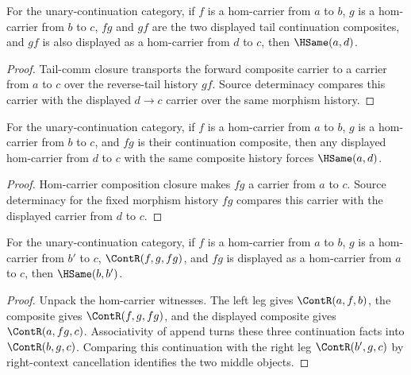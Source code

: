\begin{theorem}
\label{thm:category-hom-carrier-tail-comm-source-deterministic}
For the unary-continuation category, if $f$ is a hom-carrier from $a$ to $b$,
$g$ is a hom-carrier from $b$ to $c$, $fg$ and $gf$ are the two displayed tail
continuation composites, and $gf$ is also displayed as a hom-carrier from $d$
to $c$, then $\HSame(a,d)$.
\end{theorem}
\begin{proof}
Tail-comm closure transports the forward composite carrier to a carrier from
$a$ to $c$ over the reverse-tail history $gf$. Source determinacy compares this
carrier with the displayed $d\to c$ carrier over the same morphism history.
\end{proof}

\begin{theorem}
\label{thm:category-hom-carrier-comp-source-deterministic}
For the unary-continuation category, if $f$ is a hom-carrier from $a$ to $b$,
$g$ is a hom-carrier from $b$ to $c$, and $fg$ is their continuation composite,
then any displayed hom-carrier from $d$ to $c$ with the same composite history
forces $\HSame(a,d)$.
\end{theorem}
\begin{proof}
Hom-carrier composition closure makes $fg$ a carrier from $a$ to $c$. Source
determinacy for the fixed morphism history $fg$ compares this carrier with the
displayed carrier from $d$ to $c$.
\end{proof}

\begin{theorem}
\label{thm:category-hom-carrier-comp-middle-object-deterministic}
For the unary-continuation category, if \(f\) is a hom-carrier from \(a\) to
\(b\), \(g\) is a hom-carrier from \(b'\) to \(c\),
\(\ContR(f,g,fg)\), and \(fg\) is displayed as a hom-carrier from \(a\) to
\(c\), then \(\HSame(b,b')\).
\end{theorem}
\begin{proof}
Unpack the hom-carrier witnesses. The left leg gives \(\ContR(a,f,b)\), the
composite gives \(\ContR(f,g,fg)\), and the displayed composite gives
\(\ContR(a,fg,c)\). Associativity of append turns these three continuation
facts into \(\ContR(b,g,c)\). Comparing this continuation with the right leg
\(\ContR(b',g,c)\) by right-context cancellation identifies the two middle
objects.
\end{proof}

